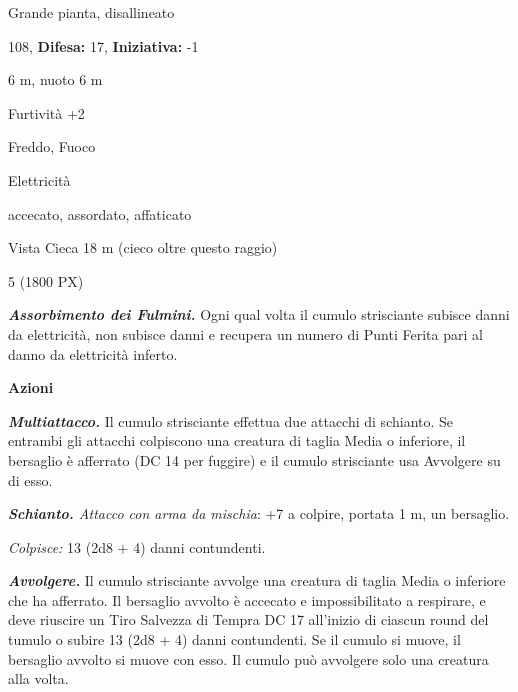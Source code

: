 \begin{multicols}{2}
{
\noindent
\begin{description}[noitemsep, topsep=0pt, parsep=0pt, partopsep=0pt, leftmargin=0cm, labelwidth=2.2cm]
	\item[\textbf{Taglia/Tipo:}] Grande pianta, disallineato
	\item[\textbf{Caratt.:}] 
	\item[\textbf{Punti Ferita:}] 108,  \textbf{Difesa:} 17,  \textbf{Iniziativa:} -1
	\item[\textbf{Movimento:}] 6 m, nuoto 6 m
	\item[\textbf{Tiri Salvez.:}] 
	\item[\textbf{Comp.:}] Furtività +2
	\item[\textbf{Res. Danni:}] Freddo, Fuoco
	\item[\textbf{Imm. Danni:}] Elettricità
	\item[\textbf{Immunità:}] accecato, assordato, affaticato
	\item[\textbf{Sensi:}] Vista Cieca 18 m (cieco oltre questo raggio)
	\item[\textbf{Sfida:}] 5 (1800 PX)\smallskip
\end{description}

\emph{\textbf{Assorbimento dei Fulmini.}} Ogni qual volta il cumulo strisciante subisce danni da elettricità, non subisce danni e recupera un numero di Punti Ferita pari al danno da elettricità inferto.

\textbf{Azioni}

\emph{\textbf{Multiattacco.}} Il cumulo strisciante effettua due attacchi di schianto. Se entrambi gli attacchi colpiscono una creatura di taglia Media o inferiore, il bersaglio è afferrato (DC 14 per fuggire) e il cumulo strisciante usa Avvolgere su di esso.

\emph{\textbf{Schianto.} Attacco con arma da mischia}: +7 a colpire, portata 1 m, un bersaglio.

\emph{Colpisce:} 13 (2d8 + 4) danni contundenti.

\emph{\textbf{Avvolgere.}} Il cumulo strisciante avvolge una creatura di taglia Media o inferiore che ha afferrato. Il bersaglio avvolto è accecato e impossibilitato a respirare, e deve riuscire un Tiro Salvezza di Tempra DC 17 all'inizio di ciascun round del tumulo o subire 13 (2d8 + 4) danni contundenti. Se il cumulo si muove, il bersaglio avvolto si muove con esso. Il cumulo può avvolgere solo una creatura alla volta.

}
\end{multicols}
